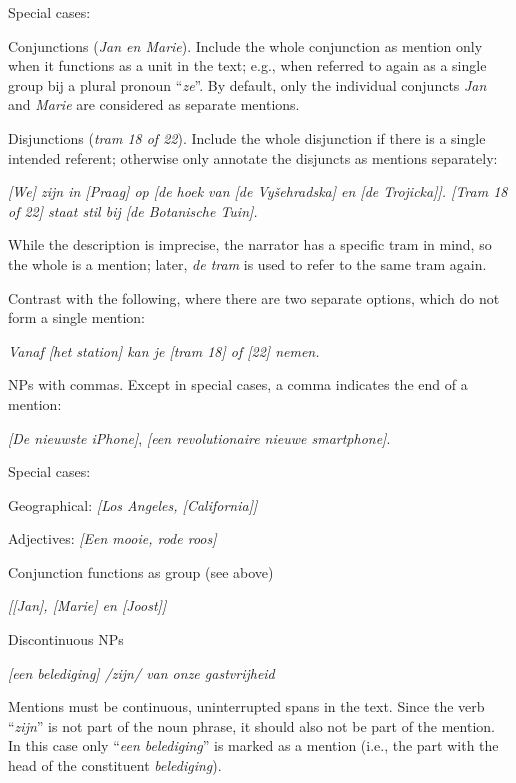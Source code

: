 Special cases:
\begin{itemize*}
\item Conjunctions (\emph{Jan en Marie}). Include the whole conjunction as
  mention only when it functions as a unit in the text;
  e.g., when referred to again as a single group bij a plural pronoun ``\emph{ze}''.
  By default, only the individual conjuncts \emph{Jan} and \emph{Marie} are
  considered as separate mentions.

\item Disjunctions (\emph{tram 18 of 22}). Include the whole disjunction if there is a single intended referent; otherwise only annotate the disjuncts as mentions separately:

    \emph{[We] zijn in [Praag] op [de hoek van [de Vyšehradska] en [de Trojicka]]. [Tram 18 of 22] staat stil bij [de Botanische Tuin].}

    While the description is imprecise, the narrator has a specific tram in mind, so the whole is a mention; later, \emph{de tram} is used to refer to the same tram again.

    Contrast with the following, where there are two separate options,
    which do not form a single mention:

    \emph{Vanaf [het station] kan je [tram 18] of [22] nemen.}

\item NPs with commas.
    Except in special cases, a comma indicates the end of a mention:

    \emph{[De nieuwste iPhone]}, \emph{[een revolutionaire nieuwe smartphone]}.

    Special cases:
    \begin{itemize*}
        \item Geographical: \emph{{[}Los Angeles, [California]{]}}
        \item Adjectives: \emph{{[}Een mooie, rode roos{]}}
        \item Conjunction functions as group (see above)

          \emph{{[}{[}Jan{]}, {[}Marie{]} en {[}Joost{]}{]}}

    \end{itemize*}

\item Discontinuous NPs

  \emph{\n{[}[een belediging] /zijn/ van onze gastvrijheid\n{]}}

    Mentions must be continuous, uninterrupted spans in the text.
    Since the verb ``\emph{zijn}'' is not part of the noun phrase,
    it should also not be part of the mention.
    In this case only ``\emph{een belediging}'' is marked as a mention
    (i.e., the part with the head of the constituent \emph{belediging}).


\end{itemize*}
